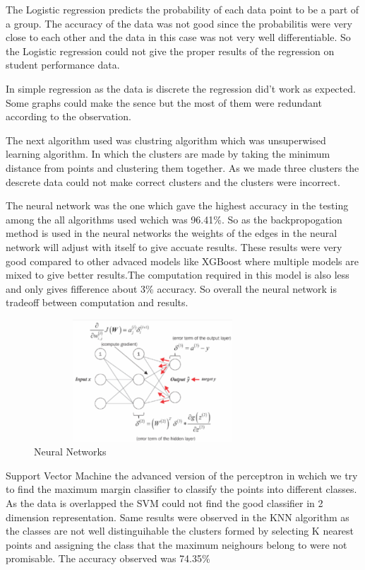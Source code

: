 \documentclass[conference,compsoc]{IEEEtran}
\begin{document}
The Logistic regression predicts the probability of each data point to be a part of a group. The accuracy of the data was not good since the probabilitis were very close to each other and the data in this case was not very well differentiable. So the Logistic regression could not give the proper results of the regression on student performance data.

In simple regression as the data is discrete the regression did’t work as expected. Some graphs could make the sence but the most of them were redundant according to the observation.


 The next algorithm used was clustring algorithm which was unsuperwised learning algorithm. In which the clusters are made by taking the minimum distance from points and clustering them together. As we made three clusters the descrete data could not make correct clusters and the clusters were incorrect.
 
 The neural network was the one which gave the highest accuracy in the testing among the all algorithms used wchich was 96.41\%. So as the backpropogation method is used in the neural networks the weights of the edges in the neural network will adjust with itself to give accuate results. These results were very good compared to other advaced models like XGBoost where multiple models are mixed to give better results.The computation required in this model is also less and only gives fifference about 3\% accuracy. So overall the neural network is tradeoff between computation and results.
 
 \begin{figure}
 	\centering
 	\includegraphics[width=3.5in,height=1.8in]{NEURAL.png}
 	\caption{Neural Networks}
 	\label{fig_3}
 \end{figure}

 Support Vector Machine the advanced version of the perceptron in wchich we try to find the maximum margin classifier to classify the points into different classes. As the data is overlapped the SVM could not find the good classifier in 2 dimension representation. Same results were observed in the KNN algorithm as the classes are not well distinguihable the clusters formed by selecting K nearest points and assigning the class that the maximum neighours belong to were not promisable. The accuracy observed was 74.35\%
 
\end{document}
